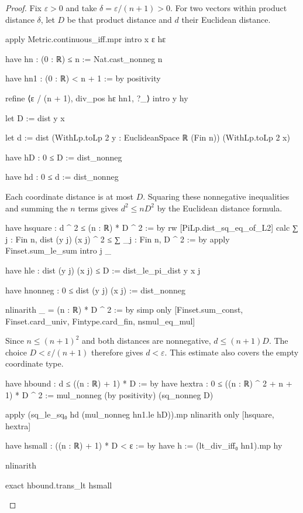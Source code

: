 \begin{proof}
  Fix $\varepsilon>0$ and take $\delta=\varepsilon/(n+1)>0$.
  For two vectors within product distance $\delta$, let $D$ be that product distance and $d$ their
  Euclidean distance.

  \begin{lean}
    apply Metric.continuous_iff.mpr
    intro x ε hε

    have hn : (0 : ℝ) ≤ n := Nat.cast_nonneg n

    have hn1 : (0 : ℝ) < n + 1 := by
      positivity

    refine ⟨ε / (n + 1), div_pos hε hn1, ?_⟩
    intro y hy

    let D := dist y x

    let d := dist (WithLp.toLp 2 y : EuclideanSpace ℝ (Fin n)) (WithLp.toLp 2 x)

    have hD : 0 ≤ D := dist_nonneg

    have hd : 0 ≤ d := dist_nonneg
  \end{lean}

  Each coordinate distance is at most $D$.
  Squaring these nonnegative inequalities and summing the $n$ terms gives $d^2\le nD^2$ by the
  Euclidean distance formula.

  \begin{lean}
    have hsquare : d ^ 2 ≤ (n : ℝ) * D ^ 2 := by
      rw [PiLp.dist_sq_eq_of_L2]
      calc
        ∑ j : Fin n, dist (y j) (x j) ^ 2 ≤ ∑ _j : Fin n, D ^ 2 := by
          apply Finset.sum_le_sum
          intro j _

          have hle : dist (y j) (x j) ≤ D := dist_le_pi_dist y x j

          have hnonneg : 0 ≤ dist (y j) (x j) := dist_nonneg

          nlinarith
        _ = (n : ℝ) * D ^ 2 := by
          simp only [Finset.sum_const, Finset.card_univ,
            Fintype.card_fin, nsmul_eq_mul]
  \end{lean}

  Since $n\le(n+1)^2$ and both distances are nonnegative, $d\le(n+1)D$.
  The choice $D<\varepsilon/(n+1)$ therefore gives $d<\varepsilon$.
  This estimate also covers the empty coordinate type.

  \begin{lean}
    have hbound : d ≤ ((n : ℝ) + 1) * D := by
      have hextra : 0 ≤ ((n : ℝ) ^ 2 + n + 1) * D ^ 2 :=
        mul_nonneg (by positivity) (sq_nonneg D)

      apply (sq_le_sq₀ hd (mul_nonneg hn1.le hD)).mp
      nlinarith only [hsquare, hextra]

    have hsmall : ((n : ℝ) + 1) * D < ε := by
      have h := (lt_div_iff₀ hn1).mp hy

      nlinarith

    exact hbound.trans_lt hsmall
  \end{lean}

\end{proof}

